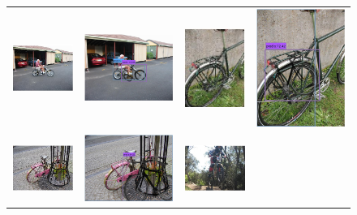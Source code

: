 \documentclass[10pt,twocolumn,letterpaper]{article}
\begin{document}
\begin{figure}[h]
\setlength\tabcolsep{1pt}
\centering
\begin{tabular}{|cc|cc|}
  \hline
  \includegraphics[width=0.22\linewidth]{supp/pas_bicycle14a.png} &
  \includegraphics[width=0.22\linewidth]{supp/pas_bicycle14b.png} & 
  \includegraphics[width=0.15\linewidth]{supp/pas_bicycle15a.png}  &
  \includegraphics[width=0.15\linewidth]{supp/pas_bicycle15b.png}  \\
  \includegraphics[width=0.22\linewidth]{supp/pas_bicycle16a.png} &
  \includegraphics[width=0.22\linewidth]{supp/pas_bicycle16b.png} & 
  \includegraphics[width=0.22\linewidth]{supp/pas_bicycle17a.png}  &

\end{tabular}
\end{figure}
\end{document}
